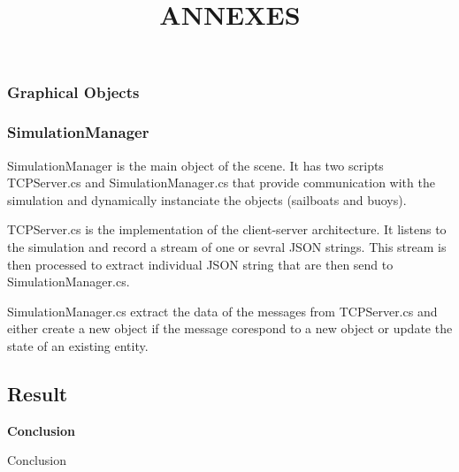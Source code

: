 \documentclass[a4paper]{report}
\begin{document}
\subsubsection{Graphical Objects}


\subsubsection{SimulationManager}

SimulationManager is the main object of the scene. It has two scripts TCPServer.cs and SimulationManager.cs that provide communication with the simulation and dynamically instanciate the objects (sailboats and buoys). 

TCPServer.cs is the implementation of the client-server architecture. It listens to the simulation and record a stream of one or sevral JSON strings. This stream is then processed to extract individual JSON string that are then send to SimulationManager.cs.

SimulationManager.cs extract the data of the messages from TCPServer.cs and either create a new object if the message corespond to a new object or update the state of an existing entity. %

\subsection{Result}


\newpage

	\begin{center}
		\textbf{\LARGE{Conclusion}}
	\end{center}

\vspace{5cm}

Conclusion

\newpage
\nocite{*}






\newpage

	\begin{center}
		\title{ \HRule{} \\ [12cm]
				\LARGE \textbf{\uppercase{Annexes}}\\ [12cm]
				\HRule{}}
		\maketitle
	\end{center}
\end{document}

